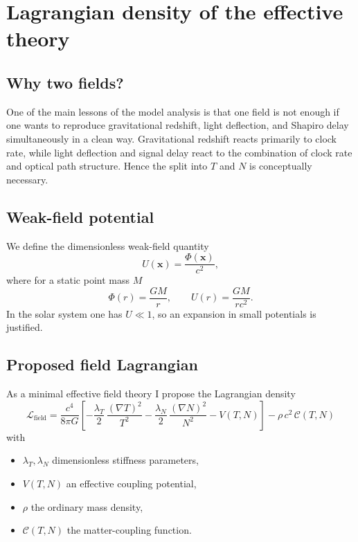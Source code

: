 \documentclass[11pt,a4paper]{article}
\begin{document}
\section{Lagrangian density of the effective theory}
\subsection{Why two fields?}
One of the main lessons of the model analysis is that one field is not enough if one wants to reproduce gravitational redshift, light deflection, and Shapiro delay simultaneously in a clean way. Gravitational redshift reacts primarily to clock rate, while light deflection and signal delay react to the combination of clock rate and optical path structure. Hence the split into $T$ and $N$ is conceptually necessary.

\subsection{Weak-field potential}
We define the dimensionless weak-field quantity
\begin{equation}
 U(\mathbf{x}) = \frac{\Phi(\mathbf{x})}{c^2},
\end{equation}
where for a static point mass $M$
\begin{equation}
 \Phi(r) = \frac{GM}{r},
 \qquad
 U(r)=\frac{GM}{rc^2}.
\end{equation}
In the solar system one has $U\ll1$, so an expansion in small potentials is justified.

\subsection{Proposed field Lagrangian}
As a minimal effective field theory I propose the Lagrangian density
\begin{equation}
\boxed{
\mathcal L_{\text{field}} =
\frac{c^4}{8\pi G}\left[
-\frac{\lambda_T}{2}\,\frac{(\nabla T)^2}{T^2}
-\frac{\lambda_N}{2}\,\frac{(\nabla N)^2}{N^2}
- V(T,N)
\right]
- \rho\,c^2\,\mathcal C(T,N)
}
\label{eq:LfieldENG}
\end{equation}
with
\begin{itemize}
    \item $\lambda_T,\lambda_N$ dimensionless stiffness parameters,
    \item $V(T,N)$ an effective coupling potential,
    \item $\rho$ the ordinary mass density,
    \item $\mathcal C(T,N)$ the matter-coupling function.
\end{itemize}
\end{document}
